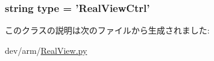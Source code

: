 \label{classRealView_1_1RealViewCtrl_a10f3e2dba94dee9578902a924571bdb5}
\hypertarget{classRealView_1_1RealViewCtrl_acce15679d830831b0bbe8ebc2a60b2ca}{
\subsubsection[{type}]{\setlength{\rightskip}{0pt plus 5cm}string {\bf type} = '{\bf RealViewCtrl}'}}
\label{classRealView_1_1RealViewCtrl_acce15679d830831b0bbe8ebc2a60b2ca}


このクラスの説明は次のファイルから生成されました:\begin{DoxyCompactItemize}
\item 
dev/arm/\hyperlink{RealView_8py}{RealView.py}\end{DoxyCompactItemize}
